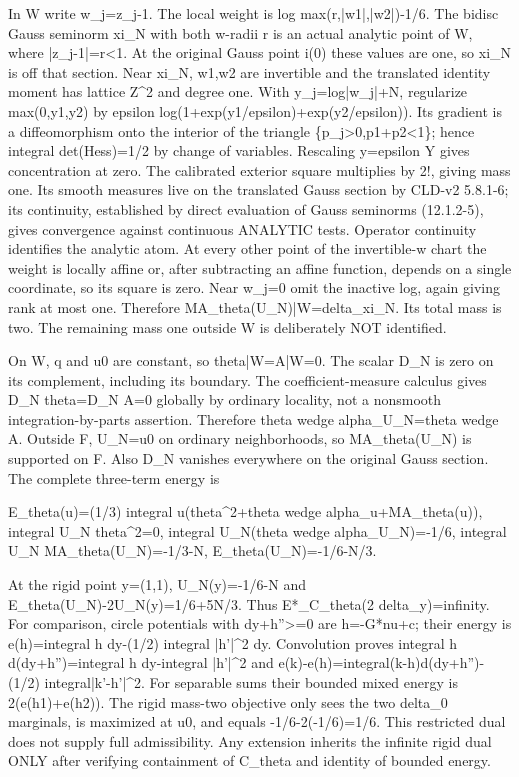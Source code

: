 \documentclass[11pt]{article}
\begin{document}
In W write w\_j=z\_j-1. The local weight is log max(r,|w1|,|w2|)-1/6. The bidisc Gauss seminorm xi\_N with both w-radii r is an actual analytic point of W, where |z\_j-1|=r<1. At the original Gauss point i(0) these values are one, so xi\_N is off that section. Near xi\_N, w1,w2 are invertible and the translated identity moment has lattice Z\textasciicircum{}2 and degree one. With y\_j=log|w\_j|+N, regularize max(0,y1,y2) by epsilon log(1+exp(y1/epsilon)+exp(y2/epsilon)). Its gradient is a diffeomorphism onto the interior of the triangle \{p\_j>0,p1+p2<1\}; hence integral det(Hess)=1/2 by change of variables. Rescaling y=epsilon Y gives concentration at zero. The calibrated exterior square multiplies by 2!, giving mass one. Its smooth measures live on the translated Gauss section by CLD-v2 5.8.1-6; its continuity, established by direct evaluation of Gauss seminorms (12.1.2-5), gives convergence against continuous ANALYTIC tests. Operator continuity identifies the analytic atom. At every other point of the invertible-w chart the weight is locally affine or, after subtracting an affine function, depends on a single coordinate, so its square is zero. Near w\_j=0 omit the inactive log, again giving rank at most one. Therefore MA\_theta(U\_N)|W=delta\_xi\_N. Its total mass is two. The remaining mass one outside W is deliberately NOT identified.

On W, q and u0 are constant, so theta|W=A|W=0. The scalar D\_N is zero on its complement, including its boundary. The coefficient-measure calculus gives D\_N theta=D\_N A=0 globally by ordinary locality, not a nonsmooth integration-by-parts assertion. Therefore theta wedge alpha\_U\_N=theta wedge A. Outside F, U\_N=u0 on ordinary neighborhoods, so MA\_theta(U\_N) is supported on F. Also D\_N vanishes everywhere on the original Gauss section. The complete three-term energy is

E\_theta(u)=(1/3) integral u(theta\textasciicircum{}2+theta wedge alpha\_u+MA\_theta(u)),
integral U\_N theta\textasciicircum{}2=0,
integral U\_N(theta wedge alpha\_U\_N)=-1/6,
integral U\_N MA\_theta(U\_N)=-1/3-N,
E\_theta(U\_N)=-1/6-N/3.

At the rigid point y=(1,1), U\_N(y)=-1/6-N and E\_theta(U\_N)-2U\_N(y)=1/6+5N/3. Thus E*\_C\_theta(2 delta\_y)=infinity. For comparison, circle potentials with dy+h''>=0 are h=-G*nu+c; their energy is e(h)=integral h dy-(1/2) integral |h'|\textasciicircum{}2 dy. Convolution proves integral h d(dy+h'')=integral h dy-integral |h'|\textasciicircum{}2 and e(k)-e(h)=integral(k-h)d(dy+h'')-(1/2) integral|k'-h'|\textasciicircum{}2. For separable sums their bounded mixed energy is 2(e(h1)+e(h2)). The rigid mass-two objective only sees the two delta\_0 marginals, is maximized at u0, and equals -1/6-2(-1/6)=1/6. This restricted dual does not supply full admissibility. Any extension inherits the infinite rigid dual ONLY after verifying containment of C\_theta and identity of bounded energy.
\end{document}
